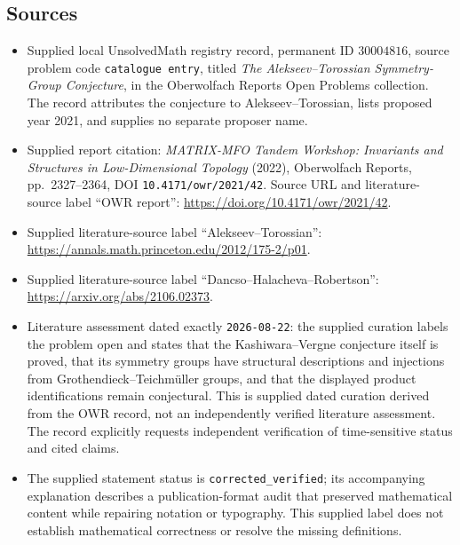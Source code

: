 \documentclass[11pt]{article}
\begin{document}
\subsection{Sources}
\begin{itemize}
\item Supplied local UnsolvedMath registry record, permanent ID \(30004816\), source problem code \texttt{catalogue entry}, titled \emph{The Alekseev--Torossian Symmetry-Group Conjecture}, in the Oberwolfach Reports Open Problems collection. The record attributes the conjecture to Alekseev--Torossian, lists proposed year 2021, and supplies no separate proposer name.
\item Supplied report citation: \emph{MATRIX-MFO Tandem Workshop: Invariants and Structures in Low-Dimensional Topology} (2022), Oberwolfach Reports, pp.\ 2327--2364, DOI \texttt{10.4171/owr/2021/42}. Source URL and literature-source label ``OWR report'': \url{https://doi.org/10.4171/owr/2021/42}.
\item Supplied literature-source label ``Alekseev--Torossian'': \url{https://annals.math.princeton.edu/2012/175-2/p01}.
\item Supplied literature-source label ``Dancso--Halacheva--Robertson'': \url{https://arxiv.org/abs/2106.02373}.
\item Literature assessment dated exactly \texttt{2026-08-22}: the supplied curation labels the problem open and states that the Kashiwara--Vergne conjecture itself is proved, that its symmetry groups have structural descriptions and injections from Grothendieck--Teichm\"uller groups, and that the displayed product identifications remain conjectural. This is supplied dated curation derived from the OWR record, not an independently verified literature assessment. The record explicitly requests independent verification of time-sensitive status and cited claims.
\item The supplied statement status is \texttt{corrected\_verified}; its accompanying explanation describes a publication-format audit that preserved mathematical content while repairing notation or typography. This supplied label does not establish mathematical correctness or resolve the missing definitions.
\end{itemize}
\end{document}
